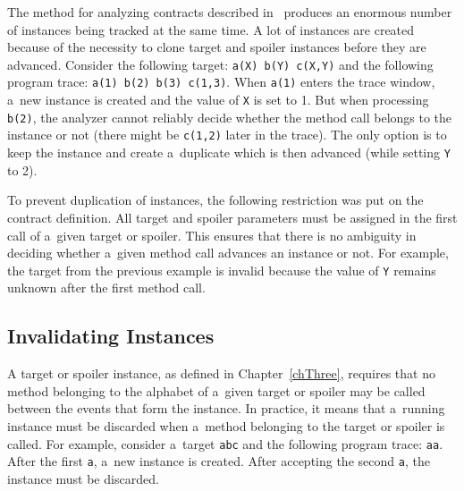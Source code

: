 The method for analyzing contracts described in~\cite{janousek} produces an
enormous number of instances being tracked at the same time. A lot of instances
are created because of the necessity to clone target and spoiler instances
before they are advanced. Consider the following target: \texttt{a(X) b(Y)
c(X,Y)} and the following program trace: \texttt{a(1) b(2) b(3) c(1,3)}.  When
\texttt{a(1)} enters the trace window, a~new instance is created and the value
of \texttt{X} is set to 1. But when processing \texttt{b(2)}, the analyzer
cannot reliably decide whether the method call belongs to the instance or not
(there might be \texttt{c(1,2)} later in the trace). The only option is to keep
the instance and create a~duplicate which is then advanced (while setting
\texttt{Y} to 2).

To prevent duplication of instances, the following restriction was put on the
contract definition. All target and spoiler parameters must be assigned in the
first call of a~given target or spoiler. This ensures that there is no ambiguity
in deciding whether a~given method call advances an instance or not. For
example, the target from the previous example is invalid because the value of
\texttt{Y} remains unknown after the first method call.

\subsection{Invalidating Instances}

A target or spoiler instance, as defined in Chapter~\ref{chThree}, requires that
no method belonging to the alphabet of a~given target or spoiler may be called
between the events that form the instance. In practice, it means that a~running
instance must be discarded when a~method belonging to the target or spoiler is
called. For example, consider a~target \texttt{abc} and the following program
trace: \texttt{aa}. After the first \texttt{a}, a~new instance is created. After
accepting the second \texttt{a}, the instance must be discarded.

